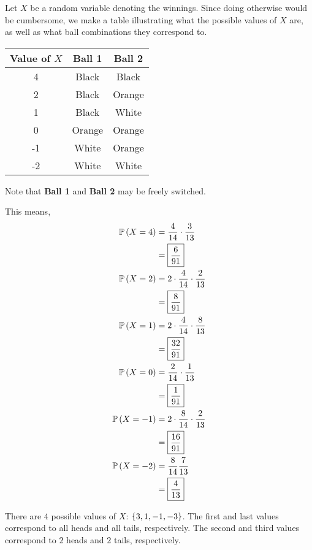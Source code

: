 \documentclass{article}
\begin{document}
\problem{}

Let $X$ be a random variable denoting the winnings.
Since doing otherwise would be cumbersome,
we make a table illustrating what the possible values of $X$ are,
as well as what ball combinations they correspond to.

\begin{center}
  \begin{tabular}{ |c|c|c| } 
    \hline
    \textbf{Value of $X$} & \textbf{Ball 1} & \textbf{Ball 2} \\ 
    \hline
    4 & Black & Black \\
    2 & Black & Orange \\
    1 & Black & White \\
    0 & Orange & Orange \\
    -1 & White & Orange \\
    -2 & White & White \\
    \hline
  \end{tabular}
\end{center}

Note that \textbf{Ball 1} and \textbf{Ball 2} may be freely switched.

This means,
\begin{align*}
  \mathbb{P} \left ( X = 4 \right) &= \frac{4}{14} \cdot \frac{3}{13} \\
             &= \boxed{\frac{6}{91}} \\
  \mathbb{P} \left ( X = 2 \right) &= 2 \cdot \frac{4}{14} \cdot \frac{2}{13} \\
             &= \boxed{\frac{8}{91}} \\
  \mathbb{P} \left ( X = 1 \right) &= 2 \cdot \frac{4}{14} \cdot \frac{8}{13} \\
             &= \boxed{\frac{32}{91}} \\
  \mathbb{P} \left ( X = 0 \right) &= \frac{2}{14} \cdot \frac{1}{13} \\
             &= \boxed{\frac{1}{91}} \\
  \mathbb{P} \left ( X = -1 \right) &= 2 \cdot \frac{8}{14} \cdot \frac{2}{13} \\
             &= \boxed{\frac{16}{91}} \\
  \mathbb{P} \left ( X = -2 \right) &= \frac{8}{14} \frac{7}{13} \\
             &= \boxed{\frac{4}{13}} \\
\end{align*}

\setcounter{problem}{5}
\problem{}
There are $4$ possible values of $X$: $\left \{ 3, 1, -1, -3 \right \}$.
The first and last values correspond to all heads and all tails,
respectively.
The second and third values correspond to $2$ heads and $2$ tails,
respectively.
\end{document}
